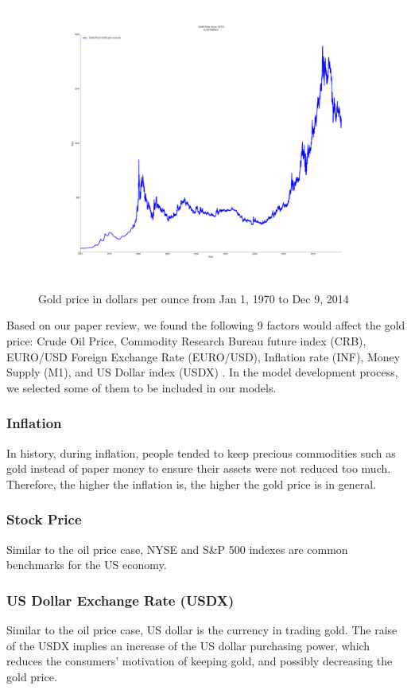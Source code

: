 \documentclass[runningheads]{llncs}
\begin{document}
\begin{figure}
\centering
\includegraphics[width=\textwidth]{Gold_since1970.png}
\caption{Gold price in dollars per ounce from Jan 1, 1970 to Dec 9, 2014}
\label{fig:Gold_since1970.png}
\end{figure}

\noindent Based on our paper review, we found the following 9 factors would affect the gold price: Crude Oil Price, Commodity Research Bureau future index (CRB), EURO/USD Foreign Exchange Rate (EURO/USD), Inflation rate (INF), Money Supply (M1), and US Dollar index (USDX) \cite{gold-shafiee}\cite{gold-zhang}\cite{gold-Ismail}. In the model development process, we selected some of them to be included in our models.

\subsubsection{Inflation}
In history, during inflation, people tended to keep precious commodities such as gold instead of paper money to ensure their assets were not reduced too much. Therefore, the higher the inflation is, the higher the gold price is in general.

\subsubsection{Stock Price}
Similar to the oil price case, NYSE and S\&P 500 indexes are common benchmarks for the US economy.

\subsubsection{US Dollar Exchange Rate (USDX)} 
Similar to the oil price case, US dollar is the currency in trading gold. The raise of the USDX implies an increase of the US dollar purchasing power, which reduces the consumers' motivation of keeping gold, and possibly decreasing the gold price.
\end{document}
